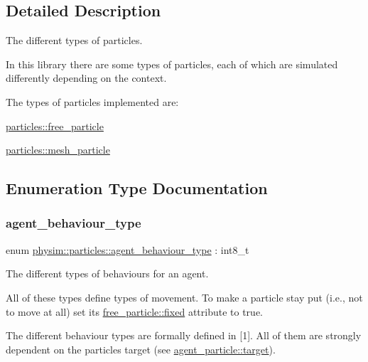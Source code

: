 \subsection{Detailed Description}
The different types of particles. 

In this library there are some types of particles, each of which are simulated differently depending on the context.

The types of particles implemented are\+:
\begin{DoxyItemize}
\item \hyperlink{classphysim_1_1particles_1_1free__particle}{particles\+::free\+\_\+particle}
\item \hyperlink{classphysim_1_1particles_1_1mesh__particle}{particles\+::mesh\+\_\+particle} 
\end{DoxyItemize}

\subsection{Enumeration Type Documentation}
\mbox{\label{namespacephysim_1_1particles_a033757595f7862a0fc8a389d79bf9c88}} 
\subsubsection{\texorpdfstring{agent\+\_\+behaviour\+\_\+type}{agent\_behaviour\_type}}
{\footnotesize\ttfamily enum \hyperlink{namespacephysim_1_1particles_a033757595f7862a0fc8a389d79bf9c88}{physim\+::particles\+::agent\+\_\+behaviour\+\_\+type} \+: int8\+\_\+t\hspace{0.3cm}{\ttfamily [strong]}}



The different types of behaviours for an agent. 

All of these types define types of movement. To make a particle stay put (i.\+e., not to move at all) set its \hyperlink{classphysim_1_1particles_1_1free__particle_a0f6d69caeac140abd74c7be4ed55eb74}{free\+\_\+particle\+::fixed} attribute to \textquotesingle{}true\textquotesingle{}.

The different behaviour types are formally defined in \mbox{[}1\mbox{]}. All of them are strongly dependent on the particle\textquotesingle{}s target (see \hyperlink{classphysim_1_1particles_1_1agent__particle_a0658207e11a5d39844856233ae8bf2cb}{agent\+\_\+particle\+::target}).

